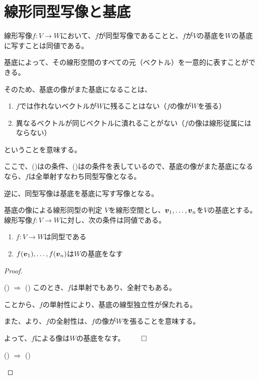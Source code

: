 \documentclass[../../../topic_linear-algebra]{subfiles}
\begin{document}
\sectionline
\section{線形同型写像と基底}

線形写像$f\colon V \to W$において、$f$が同型写像であることと、$f$が$V$の基底を$W$の基底に写すことは同値である。

\br

基底によって、その線形空間のすべての元（ベクトル）を一意的に表すことができる。

そのため、基底の像がまた基底になることは、
\begin{enumerate}[label=\romanlabel]
  \item $f$では作れないベクトルが$W$に残ることはない（$f$の像が$W$を張る）
  \item 異なるベクトルが同じベクトルに潰れることがない（$f$の像は線形従属にはならない）
\end{enumerate}
ということを意味する。

ここで、()はの条件、()はの条件を表しているので、基底の像がまた基底になるなら、$f$は全単射すなわち同型写像となる。

\br

逆に、同型写像は基底を基底に写す写像となる。

\begin{theorem*}{基底の像による線形同型の判定}
  $V$を線形空間とし、$\vb*{v}_1, \ldots, \vb*{v}_n$を$V$の基底とする。
  線形写像$f \colon V \to W$に対し、次の条件は同値である。
  \begin{enumerate}[label=\romanlabel]
    \item $f\colon V \to W$は同型である
    \item $f(\vb*{v}_1), \ldots, f(\vb*{v}_n)$は$W$の基底をなす
  \end{enumerate}
\end{theorem*}

\begin{proof}
  \begin{subpattern}{() $\Longrightarrow$ ()}
    このとき、$f$は単射でもあり、全射でもある。
    
    ことから、$f$の単射性により、基底の線型独立性が保たれる。

    また、より、$f$の全射性は、$f$の像が$W$を張ることを意味する。

    よって、$f$による像は$W$の基底をなす。 $\qed$
  \end{subpattern}
  
  \begin{subpattern}{() $\Longrightarrow$ ()}
    \todo{}
  \end{subpattern}
\end{proof}
\end{document}
